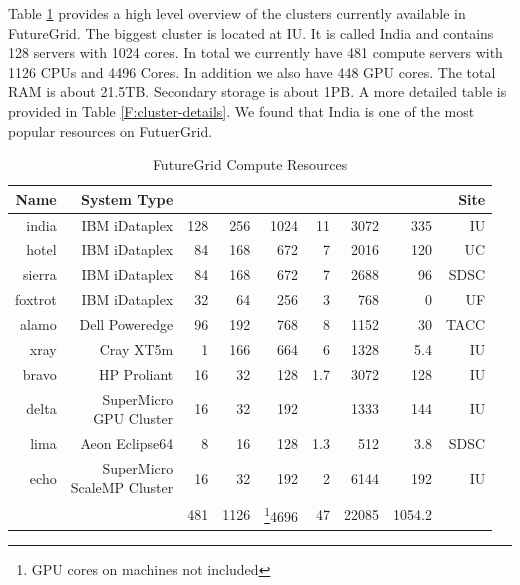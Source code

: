\documentclass[graybox]{svmult}
\newcommand*\rot{\rotatebox{90}}
\begin{document}
Table \ref{T:hw} provides a high level overview of the clusters currently available in FutureGrid.  The biggest cluster is located at IU. It is called India and contains 128 servers with 1024 cores. In total we currently have 481 compute servers with 1126 CPUs and 4496 Cores. In addition we also have 448 GPU cores. The total RAM is about 21.5TB. Secondary storage is about 1PB. A more detailed table is provided in Table \ref{F:cluster-details}. We found that India is one of the most popular resources on FutuerGrid.


\begin{table}[htb]


\caption{FutureGrid Compute Resources}\label{T:hw}


\begin{center}
\begin{tabular}{rrrrrrrrr}
Name    & System Type                &  \rot{Nodes} &  \rot{CPUS}   & \rot{Cores}   & \rot{TFLOPS}  & \rot{RAM (GB)}        & \rot{Storage (TB)}    & Site \\
\hline
india   & IBM iDataplex              & 128          & 256     & 1024    & 11      & 3072            & 335             & IU \\
hotel   & IBM iDataplex              & 84           & 168     & 672     & 7       & 2016            & 120             & UC \\
sierra  & IBM iDataplex              & 84           & 168     & 672     & 7       & 2688            & 96              & SDSC \\
foxtrot & IBM iDataplex              & 32           & 64      & 256     & 3       & 768             & 0               & UF \\
alamo   & Dell Poweredge             & 96           & 192     & 768     & 8       & 1152            & 30              & TACC \\
xray    & Cray XT5m                  & 1            & 166     & 664     & 6       & 1328            & 5.4             & IU \\
bravo   & HP Proliant                & 16           & 32      & 128     & 1.7     & 3072            & 128             & IU \\
delta   & \shortstack{SuperMicro\\ GPU Cluster}     & 16           & 32      & 192     &         & 1333            & 144             & IU \\
lima    & Aeon Eclipse64             & 8            & 16      & 128     & 1.3     & 512             & 3.8             & SDSC \\
echo    & \shortstack{SuperMicro \\ScaleMP Cluster} & 16           & 32      & 192     & 2       & 6144            & 192             & IU \\
\hline
&& 481 & 1126 & \footnote{GPU cores on machines not included}4696 & 47 & 22085 & 1054.2 \\
\end{tabular}
\end{center}
\end{table}
\end{document}
